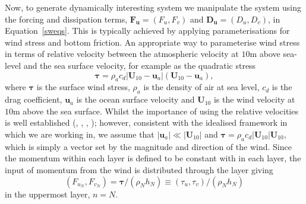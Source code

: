 \documentclass[12pt,a4paper]{report}
\newcommand*\equref[1]{Equation~\eqref{#1}}
\begin{document}
  Now, to generate dynamically interesting system we manipulate the system using 
  the forcing and
  dissipation terms, $\boldsymbol{F}_{\boldsymbol{u}} = \left(F_{u}, F_{v}\right)$ and $\boldsymbol{D}_{\boldsymbol{u}} = \left(D_{u}, D_{v}\right)$, in \equref{sweqs}.
  This is typically achieved by applying parameterisations for wind stress
  and bottom friction. An appropriate way to parameterise wind stress in terms of  
  relative velocity between the atmospheric velocity at $10 \mathrm{m}$ above sea-level
  and the sea surface velocity, for example as the quadratic stress
  \begin{equation}
  \boldsymbol{\tau}=\rho_{a} c_{d} \left|\boldsymbol{U}_{10}-\boldsymbol{u}_{a}\right|
  \left(\boldsymbol{U}_{10}-\boldsymbol{u}_{a}\right),
  \end{equation}
  where $\boldsymbol{\tau}$ is the surface wind stress, $\rho_{a}$ is the density of
  air at sea level, $c_{d}$ is the drag coefficient, $\boldsymbol{u}_{a}$ is the ocean
  surface velocity and $\boldsymbol{U}_{10}$ is the wind velocity
  at $10 \mathrm{m}$ above the sea surface.
  Whilst the importance of using the relative velocities is well established
  (\cite{duhaut2006wind}, \cite{zhai2007wind}, \cite{hughes2008wind}, \cite{zhai2012wind}); 
  however, consistent with the idealised framework in which we are 
  working in, we assume that $\left|\boldsymbol{u}_{a}\right| \ll \left|\boldsymbol{U}_{10}\right|$
  and $\boldsymbol{\tau}=\rho_{a} c_{d} \left|\boldsymbol{U}_{10}\right|
  \boldsymbol{U}_{10}$, which is simply a vector set by the 
  magnitude and direction of the wind.
   Since the momentum within each layer
  is defined to be constant with in each layer, the input of momentum from the wind
  is distributed through the layer giving
  \begin{equation*}
  \left(F_{u_{N}},F_{v_{N}}\right)=\boldsymbol{\tau}/\left(\rho_{N}h_{N}\right) \equiv
    \left(\tau_{u},\tau_{v}\right)/\left(\rho_{N}h_{N}\right)
  \end{equation*}  in the
  uppermost layer, $n=N$. 
  
\end{document}
